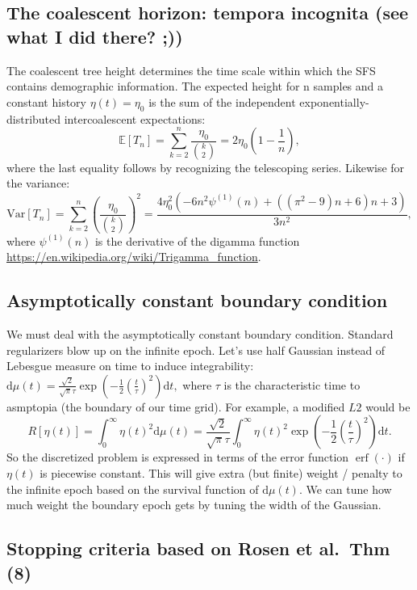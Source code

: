 \documentclass[11pt]{article}
\DeclareMathOperator{\erf}{erf}
\begin{document}
\subsection*{The coalescent horizon: tempora incognita (see what I did there? ;))}\label{sec:model:horizon}

The coalescent tree height determines the time scale within which the SFS contains demographic information.
The expected height for n samples and a constant history $\eta(t)=\eta_0$ is the sum of the independent exponentially-distributed intercoalescent expectations:
\[
\mathbb{E}[T_n] = \sum_{k=2}^n \frac{\eta_0}{\binom{k}{2}} = 2\eta_0\left(1-\frac{1}{n}\right),
\]
where the last equality follows by recognizing the telescoping series.
Likewise for the variance:
\[
\text{Var}[T_n] = \sum_{k=2}^n \left(\frac{\eta_0}{\binom{k}{2}}\right)^2 = \frac{4 \eta _0^2 \left(-6 n^2 \psi ^{(1)}(n)+\left(\left(\pi ^2-9\right) n+6\right) n+3\right)}{3 n^2},
\]
where $\psi ^{(1)}(n)$ is the derivative of the digamma function \url{https://en.wikipedia.org/wiki/Trigamma_function}.


\subsection*{Asymptotically constant boundary condition}\label{sec:model:boundary}

We must deal with the asymptotically constant boundary condition.
Standard regularizers blow up on the infinite epoch.
Let's use half Gaussian instead of Lebesgue measure on time to induce integrability: $\mathrm{d}\mu(t) = \frac{\sqrt{2}}{\sqrt{\pi}\tau}\exp\left(-\frac{1}{2}\left(\frac{t}{\tau}\right)^2\right)\mathrm{d}t,$
where $\tau$ is the characteristic time to asmptopia (the boundary of our time grid).
For example, a modified $L2$ would be
\[
R\left[\eta(t)\right] = \int_0^\infty \eta(t)^2 \mathrm{d}\mu(t) = \frac{\sqrt{2}}{\sqrt{\pi}\tau}\int_0^\infty \eta(t)^2 \exp\left(-\frac{1}{2}\left(\frac{t}{\tau}\right)^2\right)\mathrm{d}t.
\]
So the discretized problem is expressed in terms of the error function $\erf(\cdot)$ if $\eta(t)$ is piecewise constant.
This will give extra (but finite) weight / penalty to the infinite epoch based on the survival function of $\mathrm{d}\mu(t)$.
We can tune how much weight the boundary epoch gets by tuning the width of the Gaussian.


\subsection*{Stopping criteria based on Rosen et al.\ Thm (8)}\label{sec:model:stopping}
\end{document}

